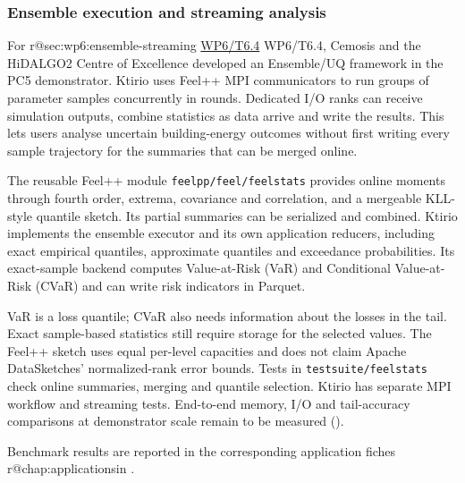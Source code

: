 \subsubsection{Ensemble execution and streaming analysis}
\label{sec:Feelpp:implementation-2026:stats}
For \ifcsname r@sec:wp6:ensemble-streaming\endcsname
  \hyperref[sec:wp6:ensemble-streaming]{WP6/T6.4}%
\else WP6/T6.4\fi, Cemosis and the HiDALGO2 Centre of Excellence developed
an Ensemble/UQ framework in the PC5 \KtirioUrbanBuildingContext{}
demonstrator. Ktirio uses Feel++ MPI communicators to run groups of
parameter samples concurrently in rounds. Dedicated I/O ranks can
receive simulation outputs, combine statistics as data arrive and write
the results. This lets users analyse uncertain building-energy outcomes
without first writing every sample trajectory for the summaries that can
be merged online.

The reusable Feel++ module \nolinkurl{feelpp/feel/feelstats} provides
online moments through fourth order, extrema, covariance and
correlation, and a mergeable KLL-style quantile sketch. Its partial
summaries can be serialized and combined. Ktirio implements the ensemble
executor and its own application reducers, including exact empirical
quantiles, approximate quantiles and exceedance probabilities. Its
exact-sample backend computes Value-at-Risk (VaR) and Conditional
Value-at-Risk (CVaR) and can write risk indicators in Parquet.

VaR is a loss quantile; CVaR also needs information about the losses in
the tail. Exact sample-based statistics still require storage for the
selected values. The Feel++ sketch uses equal per-level capacities and
does not claim Apache DataSketches' normalized-rank error bounds. Tests
in \nolinkurl{testsuite/feelstats} check online summaries, merging and
quantile selection. Ktirio has separate MPI workflow and streaming
tests. End-to-end memory, I/O and tail-accuracy comparisons at
demonstrator scale remain to be measured
().

Benchmark results are reported in the corresponding application fiches%
\ifcsname r@chap:applications\endcsname\space in \fi.
\fi
